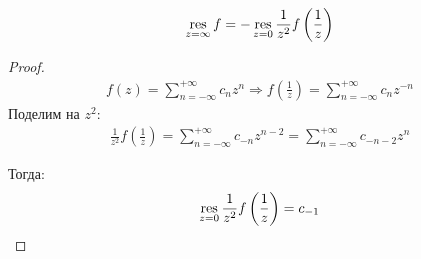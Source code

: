 \begin{property}
    \begin{gather*}
        \operatorname*{res}\limits_{z=\infty} f = - \operatorname*{res}\limits_{z=0} \frac{1}{z^2} f \left(\frac{1}{z}\right)
    \end{gather*}
\end{property}

\begin{proof}
    \begin{gather*}
        f(z) = \sum\limits_{n=-\infty}^{+\infty} c_nz^n \Longrightarrow f\left(\frac{1}{z}\right) = \sum\limits_{n=-\infty}^{+\infty} c_nz^{-n}
    \end{gather*}
    Поделим на $z^2$: 
    \begin{gather*}
        \frac{1}{z^2}f\left(\frac{1}{z}\right) = \sum\limits_{n=-\infty}^{+\infty} c_{-n}z^{n-2} = \sum\limits_{n=-\infty}^{+\infty} c_{-n-2}z^{n} 
    \end{gather*}

    Тогда: 
    \begin{gather*}
        \operatorname*{res}\limits_{z=0} \frac{1}{z^2} f\left(\frac{1}{z}\right) = c_{-1}
    \end{gather*}
\end{proof}

\newpage
